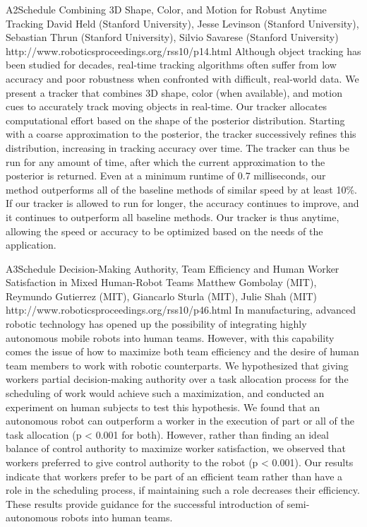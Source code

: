 \begin{spacing}{1.0}
\descriptionPaper
{A2}{Schedule}
{
Combining 3D Shape, Color, and Motion for Robust Anytime Tracking 
}
{
David Held (Stanford University), Jesse Levinson (Stanford University), Sebastian Thrun (Stanford University), Silvio Savarese (Stanford University)
}
{
http://www.roboticsproceedings.org/rss10/p14.html
}
{
Although object tracking has been studied for decades, real-time tracking algorithms often suffer from low accuracy and poor robustness when confronted with difficult, real-world data. We present a tracker that combines 3D shape, color (when available), and motion cues to accurately track moving objects in real-time. Our tracker allocates computational effort based on the shape of the posterior distribution. Starting with a coarse approximation to the posterior, the tracker successively refines this distribution, increasing in tracking accuracy over time. The tracker can thus be run for any amount of time, after which the current approximation to the posterior is returned. Even at a minimum runtime of 0.7 milliseconds, our method outperforms all of the baseline methods of similar speed by at least 10\%. If our tracker is allowed to run for longer, the accuracy continues to improve, and it continues to outperform all baseline methods. Our tracker is thus anytime, allowing the speed or accuracy to be optimized based on the needs of the application.
}


\descriptionPaper
{A3}{Schedule}
{
Decision-Making Authority, Team Efficiency and Human Worker Satisfaction in Mixed Human-Robot Teams 
}
{
Matthew Gombolay (MIT), Reymundo Gutierrez (MIT), Giancarlo Sturla (MIT), Julie Shah (MIT)
}
{
http://www.roboticsproceedings.org/rss10/p46.html
}
{
In manufacturing, advanced robotic technology has opened up the possibility of integrating highly autonomous mobile robots into human teams. However, with this capability comes the issue of how to maximize both team efficiency and the desire of human team members to work with robotic counterparts. We hypothesized that giving workers partial decision-making authority over a task allocation process for the scheduling of work would achieve such a maximization, and conducted an experiment on human subjects to test this hypothesis. We found that an autonomous robot can outperform a worker in the execution of part or all of the task allocation (p < 0.001 for both). However, rather than finding an ideal balance of control authority to maximize worker satisfaction, we observed that workers preferred to give control authority to the robot (p < 0.001). Our results indicate that workers prefer to be part of an efficient team rather than have a role in the scheduling process, if maintaining such a role decreases their efficiency. These results provide guidance for the successful introduction of semi-autonomous robots into human teams.
}



\end{spacing}
